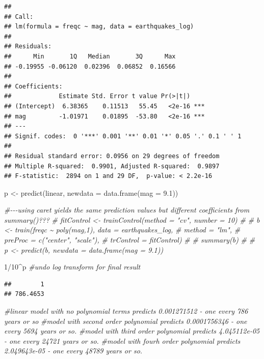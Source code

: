 \documentclass[
]{article}
\newenvironment{Shaded}{\begin{snugshade}}{\end{snugshade}}
\newcommand{\AttributeTok}[1]{\textcolor[rgb]{0.77,0.63,0.00}{#1}}
\newcommand{\CommentTok}[1]{\textcolor[rgb]{0.56,0.35,0.01}{\textit{#1}}}
\newcommand{\DecValTok}[1]{\textcolor[rgb]{0.00,0.00,0.81}{#1}}
\newcommand{\FloatTok}[1]{\textcolor[rgb]{0.00,0.00,0.81}{#1}}
\newcommand{\FunctionTok}[1]{\textcolor[rgb]{0.00,0.00,0.00}{#1}}
\newcommand{\NormalTok}[1]{#1}
\newcommand{\OtherTok}[1]{\textcolor[rgb]{0.56,0.35,0.01}{#1}}
\newcommand{\SpecialCharTok}[1]{\textcolor[rgb]{0.00,0.00,0.00}{#1}}
\begin{document}
\begin{verbatim}
## 
## Call:
## lm(formula = freqc ~ mag, data = earthquakes_log)
## 
## Residuals:
##      Min       1Q   Median       3Q      Max 
## -0.19955 -0.06120  0.02396  0.06852  0.16566 
## 
## Coefficients:
##             Estimate Std. Error t value Pr(>|t|)    
## (Intercept)  6.38365    0.11513   55.45   <2e-16 ***
## mag         -1.01971    0.01895  -53.80   <2e-16 ***
## ---
## Signif. codes:  0 '***' 0.001 '**' 0.01 '*' 0.05 '.' 0.1 ' ' 1
## 
## Residual standard error: 0.0956 on 29 degrees of freedom
## Multiple R-squared:  0.9901, Adjusted R-squared:  0.9897 
## F-statistic:  2894 on 1 and 29 DF,  p-value: < 2.2e-16
\end{verbatim}

\begin{Shaded}
\begin{Highlighting}[]
\NormalTok{p }\OtherTok{\textless{}{-}} \FunctionTok{predict}\NormalTok{(linear, }\AttributeTok{newdata =} \FunctionTok{data.frame}\NormalTok{(}\AttributeTok{mag =} \FloatTok{9.1}\NormalTok{))}

\CommentTok{\#{-}{-}{-}using caret yields the same prediction values but different coefficients from summary()???}
\CommentTok{\# fitControl \textless{}{-} trainControl(method = "cv", number = 10)}
\CommentTok{\# }
\CommentTok{\# b \textless{}{-} train(freqc \textasciitilde{} poly(mag,1), data = earthquakes\_log,}
\CommentTok{\#       method = "lm",}
\CommentTok{\#       preProc = c("center", "scale"),}
\CommentTok{\#       trControl = fitControl)}
\CommentTok{\# }
\CommentTok{\# summary(b)}
\CommentTok{\# }
\CommentTok{\# p \textless{}{-} predict(b, newdata = data.frame(mag = 9.1))}

\DecValTok{1}\SpecialCharTok{/}\DecValTok{10}\SpecialCharTok{\^{}}\NormalTok{p }\CommentTok{\#undo log transform for final result}
\end{Highlighting}
\end{Shaded}

\begin{verbatim}
##        1 
## 786.4653
\end{verbatim}

\begin{Shaded}
\begin{Highlighting}[]
\CommentTok{\#linear model with no polynomial terms predicts 0.001271512 {-} one every 786 years or so}
\CommentTok{\#model with second order polynomial predicts 0.0001756346  {-} one every 5694 years or so.}
\CommentTok{\#model with third order polynomial predicts 4.045112e{-}05  {-} one every 24721 years or so.}
\CommentTok{\#model with fourh order polynomial predicts 2.049643e{-}05   {-} one every 48789 years or so.}
\end{Highlighting}
\end{Shaded}
\end{document}

